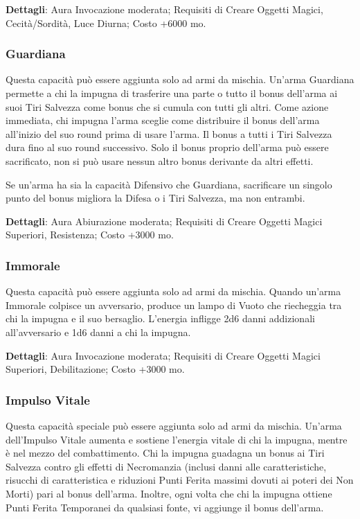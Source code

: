 \begin{multicols}{2}
\textbf{Dettagli}: Aura Invocazione moderata; Requisiti di Creare Oggetti Magici, Cecità/Sordità, Luce Diurna; Costo +6000 mo.

\subsubsection*{Guardiana}

Questa capacità può essere aggiunta solo ad armi da mischia. Un'arma Guardiana permette a chi la impugna di trasferire una parte o tutto il bonus dell'arma ai suoi Tiri Salvezza come bonus che si cumula con tutti gli altri. Come azione immediata, chi impugna l'arma sceglie come distribuire il bonus dell'arma all'inizio del suo round prima di usare l'arma. Il bonus a tutti i Tiri Salvezza dura fino al suo round successivo. Solo il bonus proprio dell'arma può essere sacrificato, non si può usare nessun altro bonus derivante da altri effetti.

Se un'arma ha sia la capacità Difensivo che Guardiana, sacrificare un singolo punto del bonus migliora la Difesa o i Tiri Salvezza, ma non entrambi.

\textbf{Dettagli}: Aura Abiurazione moderata; Requisiti di Creare Oggetti Magici Superiori, Resistenza; Costo +3000 mo.

\subsubsection*{Immorale}

Questa capacità può essere aggiunta solo ad armi da mischia. Quando un'arma Immorale colpisce un avversario, produce un lampo di Vuoto che riecheggia tra chi la impugna e il suo bersaglio. L'energia infligge 2d6 danni addizionali all'avversario e 1d6 danni a chi la impugna.

\textbf{Dettagli}: Aura Invocazione moderata; Requisiti di Creare Oggetti Magici Superiori, Debilitazione; Costo +3000 mo.

\subsubsection*{Impulso Vitale}

Questa capacità speciale può essere aggiunta solo ad armi da mischia. Un'arma dell'Impulso Vitale aumenta e sostiene l'energia vitale di chi la impugna, mentre è nel mezzo del combattimento. Chi la impugna guadagna un bonus ai Tiri Salvezza contro gli effetti di Necromanzia (inclusi danni alle caratteristiche, risucchi di caratteristica e riduzioni Punti Ferita massimi dovuti ai poteri dei Non Morti) pari al bonus dell'arma. Inoltre, ogni volta che chi la impugna ottiene Punti Ferita Temporanei da qualsiasi fonte, vi aggiunge il bonus dell'arma.


\end{multicols}
